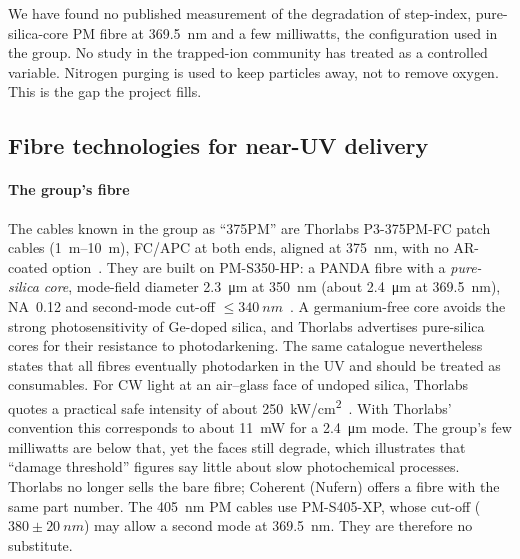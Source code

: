 \begin{keybox}
We have found no published measurement of the degradation of step-index, pure-silica-core PM fibre at
\SI{369.5}{nm} and a few milliwatts, the configuration used in the group. No study in the trapped-ion
community has treated \Oxy{} as a controlled variable. Nitrogen purging is used to keep particles away,
not to remove oxygen. This is the gap the project fills.
\end{keybox}

\subsection{Fibre technologies for near-UV delivery}\label{sec:sota-fibres}
\paragraph{The group's fibre} The cables known in the group as ``375PM'' are Thorlabs P3-375PM-FC
patch cables (\SIrange{1}{10}{m}), FC/APC at both ends, aligned at \SI{375}{nm}, with no AR-coated
option~\cite{ThorlabsP3375PM}. They are built on PM-S350-HP: a PANDA fibre with a \emph{pure-silica
core}, mode-field diameter \SI{2.3}{\micro m} at \SI{350}{nm} (about \SI{2.4}{\micro m} at
\SI{369.5}{nm}), NA~0.12 and second-mode cut-off $\leq\SI{340}{nm}$~\cite{ThorlabsPMS350}. A
germanium-free core avoids the strong photosensitivity of Ge-doped silica, and Thorlabs advertises
pure-silica cores for their resistance to photodarkening. The same catalogue nevertheless states that all
fibres eventually photodarken in the UV and should be treated as consumables. For CW light at an
air--glass face of undoped silica, Thorlabs quotes a practical safe intensity of about
\SI{250}{kW/cm^2}~\cite{ThorlabsDamage}. With Thorlabs' convention this corresponds to about \SI{11}{mW}
for a \SI{2.4}{\micro m} mode. The group's few milliwatts are below that, yet the faces still degrade,
which illustrates that ``damage threshold'' figures say little about slow photochemical processes.
Thorlabs no longer sells the bare fibre; Coherent (Nufern) offers a fibre with the same part number. The
\SI{405}{nm} PM cables use PM-S405-XP, whose cut-off ($380\pm\SI{20}{nm}$) may allow a second mode at
\SI{369.5}{nm}. They are therefore no substitute.


